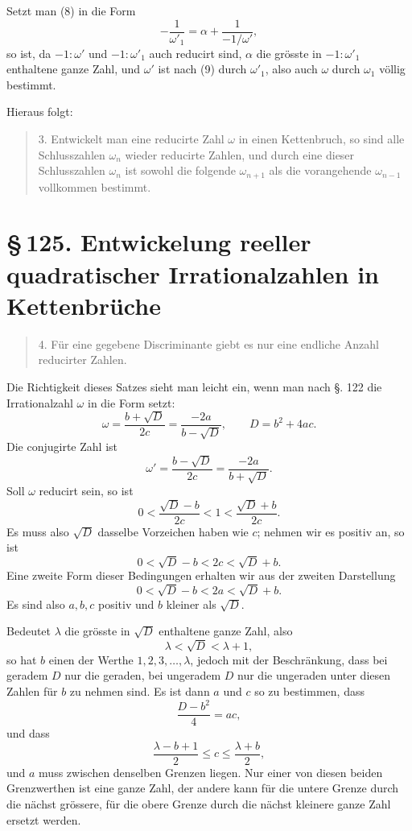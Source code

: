 \documentclass[11pt]{article}
\providecommand{\sect}[2]{\section*{\S\,#1. #2}}
\begin{document}
Setzt man (8) in die Form
\[
\tag{9}        -\frac1{\omega'_1}=\alpha+\frac1{-1/\omega'},
\]
so ist, da $-1:\omega'$ und $-1:\omega'_1$ auch reducirt sind, $\alpha$ die grösste in $-1:\omega'_1$ enthaltene ganze Zahl, und $\omega'$ ist nach (9) durch $\omega'_1$, also auch $\omega$ durch $\omega_1$ völlig bestimmt.

Hieraus folgt:
\begin{quote}
3. Entwickelt man eine reducirte Zahl $\omega$ in einen Kettenbruch, so sind alle Schlusszahlen $\omega_n$ wieder reducirte Zahlen, und durch eine dieser Schlusszahlen $\omega_n$ ist sowohl die folgende $\omega_{n+1}$ als die vorangehende $\omega_{n-1}$ vollkommen bestimmt.
\end{quote}

\sect{125}{Entwickelung reeller quadratischer Irrationalzahlen in Kettenbrüche}

\begin{quote}
4. Für eine gegebene Discriminante giebt es nur eine endliche Anzahl reducirter Zahlen.
\end{quote}

Die Richtigkeit dieses Satzes sieht man leicht ein, wenn man nach §. 122 die Irrationalzahl $\omega$ in die Form setzt:
\[
\tag{1}        \omega=\frac{b+\sqrt D}{2c}
=\frac{-2a}{b-\sqrt D},\qquad D=b^2+4ac.
\]
Die conjugirte Zahl ist
\[
\tag{2}        \omega'=\frac{b-\sqrt D}{2c}
=\frac{-2a}{b+\sqrt D}.
\]
Soll $\omega$ reducirt sein, so ist
\[
\tag{3}        0<\frac{\sqrt D-b}{2c}<1<\frac{\sqrt D+b}{2c}.
\]
Es muss also $\sqrt D$ dasselbe Vorzeichen haben wie $c$; nehmen wir es positiv an, so ist
\[
\tag{4}        0<\sqrt D-b<2c<\sqrt D+b.
\]
Eine zweite Form dieser Bedingungen erhalten wir aus der zweiten Darstellung
\[
\tag{5}        0<\sqrt D-b<2a<\sqrt D+b.
\]
Es sind also $a,b,c$ positiv und $b$ kleiner als $\sqrt D$.

Bedeutet $\lambda$ die grösste in $\sqrt D$ enthaltene ganze Zahl, also
\[
        \lambda<\sqrt D<\lambda+1,
\]
so hat $b$ einen der Werthe $1,2,3,\ldots,\lambda$, jedoch mit der Beschränkung, dass bei geradem $D$ nur die geraden, bei ungeradem $D$ nur die ungeraden unter diesen Zahlen für $b$ zu nehmen sind. Es ist dann $a$ und $c$ so zu bestimmen, dass
\[
\tag{6}        \frac{D-b^2}{4}=ac,
\]
und dass
\[
\tag{7}        \frac{\lambda-b+1}{2}\le c\le \frac{\lambda+b}{2},
\]
und $a$ muss zwischen denselben Grenzen liegen. Nur einer von diesen beiden Grenzwerthen ist eine ganze Zahl, der andere kann für die untere Grenze durch die nächst grössere, für die obere Grenze durch die nächst kleinere ganze Zahl ersetzt werden.
\end{document}
